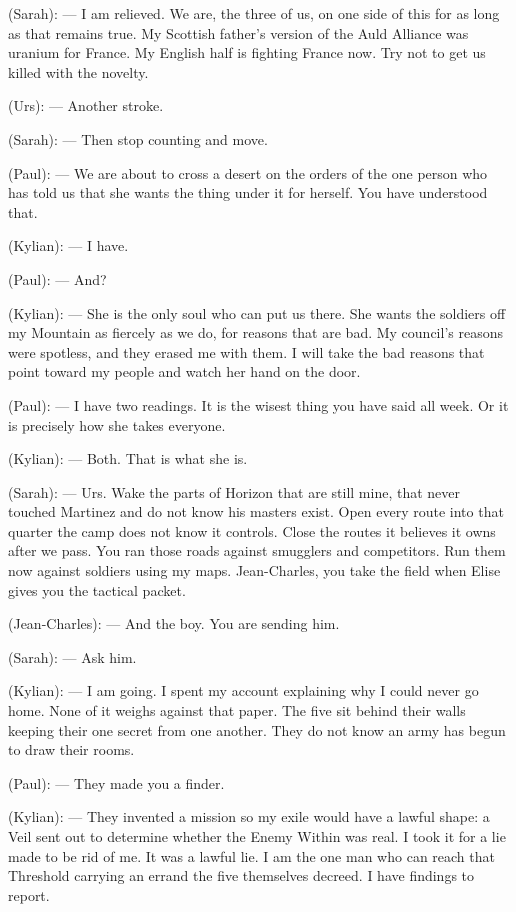\begin{room}
(Sarah): --- I am relieved. We are, the three of us, on one side of this for as long as that remains true. My Scottish father's version of the Auld Alliance was uranium for France. My English half is fighting France now. Try not to get us killed with the novelty.

(Urs): --- Another stroke.

(Sarah): --- Then stop counting and move.

\centerline{}

(Paul): --- We are about to cross a desert on the orders of the one person who has told us that she wants the thing under it for herself. You have understood that.

(Kylian): --- I have.

(Paul): --- And?

(Kylian): --- She is the only soul who can put us there. She wants the soldiers off my Mountain as fiercely as we do, for reasons that are bad. My council's reasons were spotless, and they erased me with them. I will take the bad reasons that point toward my people and watch her hand on the door.

(Paul): --- I have two readings. It is the wisest thing you have said all week. Or it is precisely how she takes everyone.

(Kylian): --- Both. That is what she is.

(Sarah): --- Urs. Wake the parts of Horizon that are still mine, that never touched Martinez and do not know his masters exist. Open every route into that quarter the camp does not know it controls. Close the routes it believes it owns after we pass. You ran those roads against smugglers and competitors. Run them now against soldiers using my maps. Jean-Charles, you take the field when Elise gives you the tactical packet.

(Jean-Charles): --- And the boy. You are sending him.

(Sarah): --- Ask him.

(Kylian): --- I am going. I spent my account explaining why I could never go home. None of it weighs against that paper. The five sit behind their walls keeping their one secret from one another. They do not know an army has begun to draw their rooms.

(Paul): --- They made you a finder.

(Kylian): --- They invented a mission so my exile would have a lawful shape: a Veil sent out to determine whether the Enemy Within was real. I took it for a lie made to be rid of me. It was a lawful lie. I am the one man who can reach that Threshold carrying an errand the five themselves decreed. I have findings to report.


\end{room}
